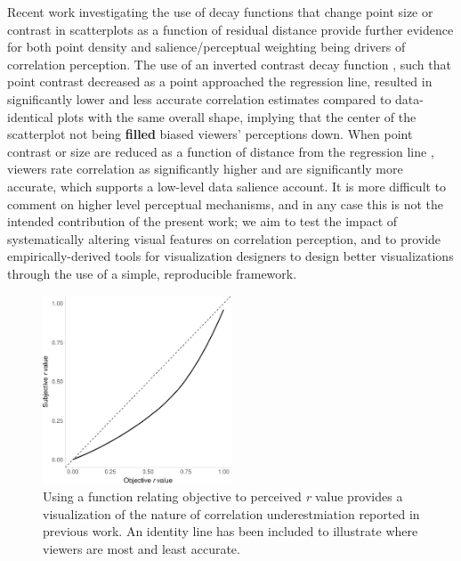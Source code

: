 \documentclass[manuscript, review, anonymous, screen]{acmart}
\begin{document}
Recent work investigating the use of decay functions that change point
size or contrast in scatterplots as a function of residual distance
provide further evidence for both point density and salience/perceptual
weighting being drivers of correlation perception. The use of an
inverted contrast decay function \citep{strain_2023}, such that point
contrast decreased as a point approached the regression line, resulted
in significantly lower and less accurate correlation estimates compared
to data-identical plots with the same overall shape, implying that the
center of the scatterplot not being \textbf{filled} biased viewers'
perceptions down. When point contrast or size are reduced as a function
of distance from the regression line \citep{strain_2023, strain_2023b},
viewers rate correlation as significantly higher and are significantly
more accurate, which supports a low-level data salience account. It is
more difficult to comment on higher level perceptual mechanisms, and in
any case this is not the intended contribution of the present work; we
aim to test the impact of systematically altering visual features on
correlation perception, and to provide empirically-derived tools for
visualization designers to design better visualizations through the use
of a simple, reproducible framework.

\begin{figure}

\includegraphics[width=0.5\textwidth,height=\textheight]{size_and_contrast_new_files/figure-pdf/fig-underestimation-curve-1.pdf} \hfill{}

\caption{\label{fig-underestimation-curve}Using a function relating
objective to perceived \emph{r} value \citep{rensink_2017} provides a
visualization of the nature of correlation underestmiation reported in
previous work. An identity line has been included to illustrate where
viewers are most and least accurate.}

\end{figure}
\end{document}
